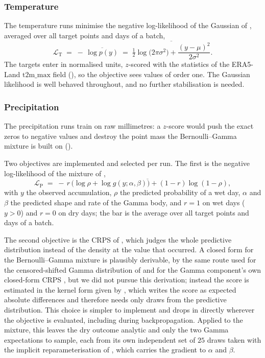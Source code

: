 \subsubsection*{Temperature}\label{subsubsec:meth-train-tmax}

The temperature runs minimise the negative log-likelihood of the Gaussian of , averaged over all target points and days of a batch,
\begin{equation}
    \mathcal{L}_{\mathrm{T}} \;=\; -\,\overline{\log p(y)} \;=\; \overline{\tfrac{1}{2}\log\bigl(2\pi\sigma^{2}\bigr) + \frac{(y - \mu)^{2}}{2\sigma^{2}}}.
\label{eq:gauss-ll}
\end{equation}
The targets enter in normalised units, $z$-scored with the statistics of the ERA5-Land $\mathrm{t2m\_max}$ field (), so the objective sees values of order one. The Gaussian likelihood is well behaved throughout, and no further stabilisation is needed.

\subsubsection*{Precipitation}\label{subsubsec:meth-train-precip}

The precipitation runs train on raw millimetres: a $z$-score would push the exact zeros to negative values and destroy the point mass the Bernoulli--Gamma mixture is built on ().

Two objectives are implemented and selected per run. The first is the negative log-likelihood of the mixture of ,
\begin{equation}
    \mathcal{L}_{\mathrm{P}} \;=\; -\,\overline{r\,\bigl(\log \rho + \log g(y; \alpha, \beta)\bigr) + (1-r)\log(1-\rho)},
\label{eq:bg-ll}
\end{equation}
with $y$ the observed accumulation, $\rho$ the predicted probability of a wet day, $\alpha$ and $\beta$ the predicted shape and rate of the Gamma body, and $r=1$ on wet days ($y>0$) and $r=0$ on dry days; the bar is the average over all target points and days of a batch.

The second objective is the CRPS of , which judges the whole predictive distribution instead of the density at the value that occurred. A closed form for the Bernoulli--Gamma mixture is plausibly derivable, by the same route used for the censored-shifted Gamma distribution of \textcite{scheuerer2015csgd} and for the Gamma component's own closed-form CRPS \cite{gneiting2007scoring}, but we did not pursue this derivation; instead the score is estimated in the kernel form given by \textcite{gneiting2007scoring}, which writes the score as expected absolute differences and therefore needs only draws from the predictive distribution. This choice is simpler to implement and drops in directly wherever the objective is evaluated, including during backpropagation. Applied to the mixture, this leaves the dry outcome analytic and only the two Gamma expectations to sample, each from its own independent set of $25$ draws taken with the implicit reparameterisation of \textcite{figurnov2018implicit}, which carries the gradient to $\alpha$ and $\beta$.

